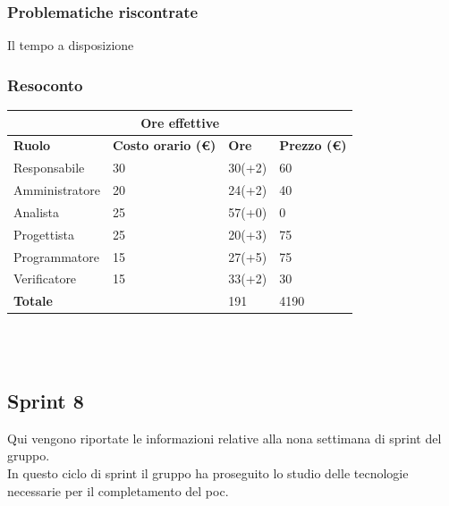 \documentclass[9pt]{article}
\begin{document}
\subsubsection{Problematiche riscontrate}
Il tempo a disposizione

\subsubsection{Resoconto}
\begin{center}
	\begin{tabularx}{\textwidth}{|X|X|X|X|}
		\hline
		\multicolumn{4}{|c|}{\textbf{Ore effettive}}                                      \\
		\hline
		\hline
		\textbf{Ruolo}  & \textbf{Costo orario (\euro)} & \textbf{Ore} & \textbf{Prezzo (\euro)} \\
		\hline
		Responsabile    & 30                            & 30(+2)       & 60                      \\
		\hline
		Amministratore  & 20                            & 24(+2)       & 40                      \\
		\hline
		Analista        & 25                            & 57(+0)       & 0                       \\
		\hline
		Progettista     & 25                            & 20(+3)       & 75                      \\
		\hline
		Programmatore   & 15                            & 27(+5)       & 75                      \\
		\hline
		Verificatore    & 15                            & 33(+2)       & 30                      \\
		\hline
		\hline
		\textbf{Totale} &                               & 191          & 4190                    \\
		\hline
	\end{tabularx}\\[8pt]
	\mbox{}\\
\end{center}

\subsection{Sprint 8}
Qui vengono riportate le informazioni relative alla nona settimana di sprint del gruppo. \\
In questo ciclo di sprint il gruppo ha proseguito lo studio delle tecnologie necessarie per il completamento del poc. \\
\end{document}
